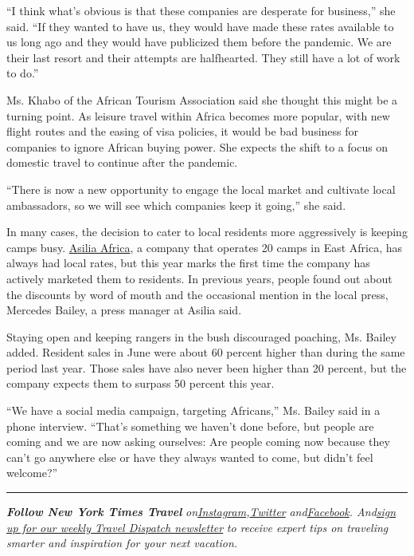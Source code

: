 ``I think what's obvious is that these companies are desperate for
business,'' she said. ``If they wanted to have us, they would have made
these rates available to us long ago and they would have publicized them
before the pandemic. We are their last resort and their attempts are
halfhearted. They still have a lot of work to do.''

Ms. Khabo of the African Tourism Association said she thought this might
be a turning point. As leisure travel within Africa becomes more
popular, with new flight routes and the easing of visa policies, it
would be bad business for companies to ignore African buying power. She
expects the shift to a focus on domestic travel to continue after the
pandemic.

``There is now a new opportunity to engage the local market and
cultivate local ambassadors, so we will see which companies keep it
going,'' she said.

In many cases, the decision to cater to local residents more
aggressively is keeping camps busy.
\href{https://www.asiliaafrica.com/}{Asilia Africa}, a company that
operates 20 camps in East Africa, has always had local rates, but this
year marks the first time the company has actively marketed them to
residents. In previous years, people found out about the discounts by
word of mouth and the occasional mention in the local press, Mercedes
Bailey, a press manager at Asilia said.

Staying open and keeping rangers in the bush discouraged poaching, Ms.
Bailey added. Resident sales in June were about 60 percent higher than
during the same period last year. Those sales have also never been
higher than 20 percent, but the company expects them to surpass 50
percent this year.

``We have a social media campaign, targeting Africans,'' Ms. Bailey said
in a phone interview. ``That's something we haven't done before, but
people are coming and we are now asking ourselves: Are people coming now
because they can't go anywhere else or have they always wanted to come,
but didn't feel welcome?''

\begin{center}\rule{0.5\linewidth}{\linethickness}\end{center}

\emph{\textbf{Follow New York Times Travel}}
\emph{on}\href{https://www.instagram.com/nytimestravel/}{\emph{Instagram}}\emph{,}\href{https://twitter.com/nytimestravel}{\emph{Twitter}}
\emph{and}\href{https://www.facebookcorewwwi.onion/nytimestravel/}{\emph{Facebook}}\emph{.
And}\href{https://www.nytimes3xbfgragh.onion/newsletters/traveldispatch}{\emph{sign
up for our weekly Travel Dispatch newsletter}} \emph{to receive expert
tips on traveling smarter and inspiration for your next vacation.}

